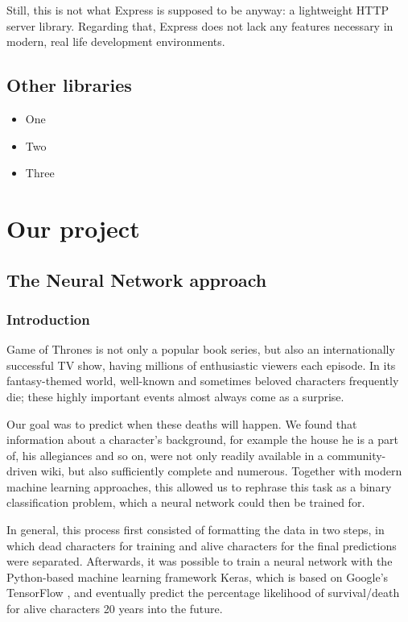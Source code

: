 \documentclass{bioinfo}
\begin{document}
Still, this is not what Express is supposed to be anyway: a lightweight HTTP server library. Regarding that, Express does not lack any features necessary in modern, real life development environments.

\subsection{Other libraries}
\begin{itemize}
    \item One
    \item Two
    \item Three
\end{itemize}

\section{Our project}

\subsection{The Neural Network approach}

\subsubsection{Introduction}

Game of Thrones is not only a popular book series, but also an internationally successful TV show, having millions of enthusiastic viewers each episode. In its fantasy-themed world, well-known and sometimes beloved characters frequently die; these highly important events almost always come as a surprise.

Our goal was to predict when these deaths will happen. We found that information about a character's background, for example the house he is a part of, his allegiances and so on, were not only readily available in a community-driven wiki, but also sufficiently complete and numerous. Together with modern machine learning approaches, this allowed us to rephrase this task as a binary classification problem, which a neural network could then be trained for.

In general, this process first consisted of formatting the data in two steps, in which dead characters for training and alive characters for the final predictions were separated. Afterwards, it was possible to train a neural network with the Python-based machine learning framework Keras, which is based on Google's TensorFlow \cite{keras}, and eventually predict the percentage likelihood of survival/death for alive characters 20 years into the future.
\end{document}
